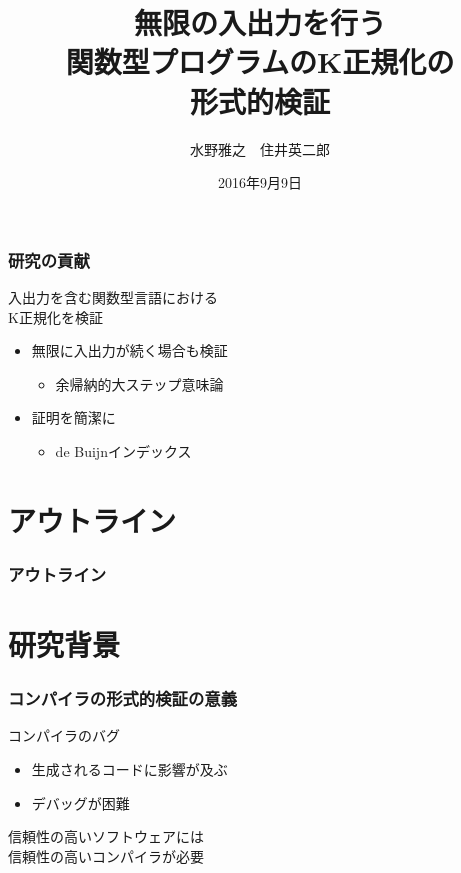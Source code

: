 \documentclass[dvipdfmx,cjk,xcolor=dvipsnames,envcountsect,notheorems,12pt]{beamer}
\title{無限の入出力を行う\\関数型プログラムのK正規化の\\形式的検証}
\author{水野雅之　住井英二郎}
\institute[東北大学　住井・松田研]{東北大学 大学院情報科学研究科}%
\date{2016年9月9日}
\theoremstyle{definition}
\begin{document}
\frame[plain]{\titlepage}%

\begin{frame}
	\frametitle{研究の貢献}
	\LARGE 入出力を含む関数型言語における\\
	K正規化を検証
	\begin{itemize}
		\item 無限に入出力が続く場合も検証
			\begin{itemize}
				\item 余帰納的大ステップ意味論
			\end{itemize}
		\item 証明を簡潔に
			\begin{itemize}
				\item de Buijnインデックス
			\end{itemize}
	\end{itemize}
\end{frame}

\section*{アウトライン}

\begin{frame}
  \frametitle{アウトライン}
  \tableofcontents[sectionstyle=show,subsectionstyle=hide]
\end{frame}

\section{研究背景}

\begin{frame}
	\frametitle{コンパイラの形式的検証の意義}
	\LARGE コンパイラのバグ
	\begin{itemize}
		\item 生成されるコードに影響が及ぶ
		\item デバッグが困難
	\end{itemize}

	\vfill

	信頼性の高いソフトウェアには\\信頼性の高いコンパイラが必要
\end{frame}
\end{document}
